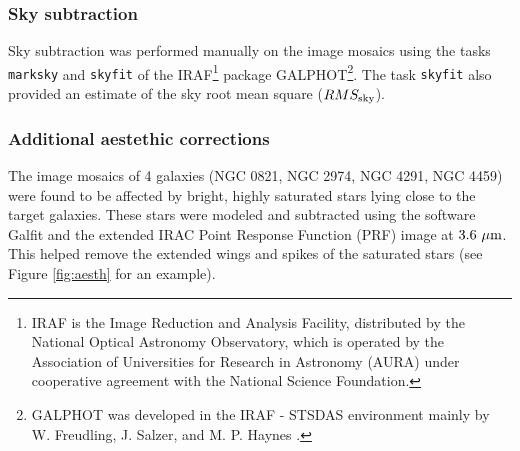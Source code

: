\documentclass[preprint2]{emulateapj}
\begin{document}
\subsubsection{Sky subtraction}
Sky subtraction was performed manually on the image mosaics using the tasks {\tt marksky} and {\tt skyfit} 
of the IRAF\footnote{IRAF is the Image Reduction and Analysis Facility, 
distributed by the National Optical Astronomy Observatory, 
which is operated by the Association of Universities for Research in Astronomy (AURA) 
under cooperative agreement with the National Science Foundation.} 
package GALPHOT\footnote{GALPHOT was developed in the IRAF - STSDAS environment mainly by 
W. Freudling, J. Salzer, and M. P. Haynes \citep{haynes1999galphot}.}.
The task {\tt skyfit} also provided an estimate of the sky root mean square ($RMS_{\rm sky}$).

\subsubsection{Additional aestethic corrections}
\label{sec:aesth}
The image mosaics of 4 galaxies (NGC 0821, NGC 2974, NGC 4291, NGC 4459) were found to be affected 
by bright, highly saturated stars lying close to the target galaxies.
These stars were modeled and subtracted using the software Galfit \citep{peng2010} 
and the extended IRAC Point Response Function (PRF) image at $3.6~\rm \mu m$.
This helped remove the extended wings and spikes of the saturated stars 
(see Figure \ref{fig:aesth} for an example).
\end{document}
